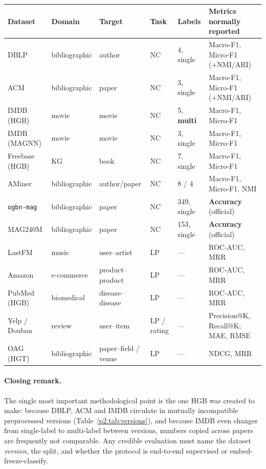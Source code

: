 \begin{table}[htbp]
\centering
\small
\caption{}
\label{p2:tab:summary}
\begin{tabular}{llllll}
\toprule
Dataset & Domain & Target & Task & Labels & Metrics normally reported \\
\midrule
DBLP      & bibliographic & author  & NC     & 4, single & Macro-F1, Micro-F1 (+NMI/ARI) \\
ACM       & bibliographic & paper   & NC     & 3, single & Macro-F1, Micro-F1 (+NMI/ARI) \\
IMDB (HGB)& movie         & movie   & NC     & 5, \textbf{multi} & Macro-F1, Micro-F1 \\
IMDB (MAGNN)& movie       & movie   & NC     & 3, single & Macro-F1, Micro-F1 \\
Freebase (HGB) & KG       & book    & NC     & 7, single & Macro-F1, Micro-F1 \\
AMiner    & bibliographic & author/paper & NC & 8 / 4    & Macro-F1, Micro-F1, NMI \\
\texttt{ogbn-mag} & bibliographic & paper & NC & 349, single & \textbf{Accuracy} (official) \\
MAG240M   & bibliographic & paper   & NC     & 153, single & \textbf{Accuracy} (official) \\
\midrule
LastFM    & music         & user--artist & LP & ---      & ROC-AUC, MRR \\
Amazon    & e-commerce    & product--product & LP & ---  & ROC-AUC, MRR \\
PubMed (HGB) & biomedical & disease--disease & LP & ---  & ROC-AUC, MRR \\
Yelp / Douban & review    & user--item & LP / rating & --- & Precision@K, Recall@K; MAE, RMSE \\
OAG (HGT) & bibliographic & paper--field / venue & LP & --- & NDCG, MRR \\
\bottomrule
\end{tabular}
\end{table}

\paragraph{Closing remark.} The single most important methodological point is the one HGB was
created to make: because DBLP, ACM and IMDB circulate in mutually incompatible preprocessed
versions (Table~\ref{p2:tab:versions}), and because IMDB even changes from single-label to
multi-label between versions, numbers copied across papers are frequently not comparable. Any
credible evaluation must name the dataset \emph{version}, the split, and whether the protocol is
end-to-end supervised or embed-freeze-classify.
